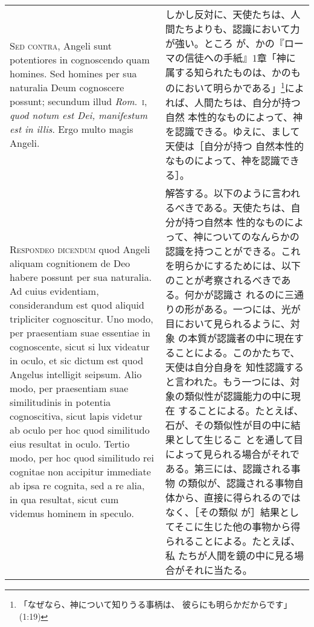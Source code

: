 \documentclass[10pt]{jsarticle} %
\begin{document}
\begin{longtable}{p{21em}p{21em}}
\\


{\scshape Sed contra}, Angeli sunt potentiores in cognoscendo quam
homines. Sed homines per sua naturalia Deum cognoscere possunt;
secundum illud {\itshape Rom}.~{\scshape i}, {\itshape quod notum est
Dei, manifestum est in illis}. Ergo multo magis Angeli.


&


しかし反対に、天使たちは、人間たちよりも、認識において力が強い。ところ
が、かの『ローマの信徒への手紙』1章「神に属する知られたものは、かのも
のにおいて明らかである」\footnote{「なぜなら、神について知りうる事柄は、
彼らにも明らかだからです」(1:19)}によれば、人間たちは、自分が持つ自然
本性的なものによって、神を認識できる。ゆえに、まして天使は［自分が持つ
自然本性的なものによって、神を認識できる］。

\\


{\scshape Respondeo dicendum} quod Angeli aliquam cognitionem de Deo
habere possunt per sua naturalia. Ad cuius evidentiam, considerandum
est quod aliquid tripliciter cognoscitur. Uno modo, per praesentiam
suae essentiae in cognoscente, sicut si lux videatur in oculo, et sic
dictum est quod Angelus intelligit seipsum. Alio modo, per praesentiam
suae similitudinis in potentia cognoscitiva, sicut lapis videtur ab
oculo per hoc quod similitudo eius resultat in oculo. Tertio modo, per
hoc quod similitudo rei cognitae non accipitur immediate ab ipsa re
cognita, sed a re alia, in qua resultat, sicut cum videmus hominem in
speculo.


&


解答する。以下のように言われるべきである。天使たちは、自分が持つ自然本
性的なものによって、神についてのなんらかの認識を持つことができる。これ
を明らかにするためには、以下のことが考察されるべきである。何かが認識さ
れるのに三通りの形がある。一つには、光が目において見られるように、対象
の本質が認識者の中に現在することによる。このかたちで、天使は自分自身を
知性認識すると言われた。もう一つには、対象の類似性が認識能力の中に現在
することによる。たとえば、石が、その類似性が目の中に結果として生じるこ
とを通して目によって見られる場合がそれである。第三には、認識される事物
の類似が、認識される事物自体から、直接に得られるのではなく、［その類似
が］結果としてそこに生じた他の事物から得られることによる。たとえば、私
たちが人間を鏡の中に見る場合がそれに当たる。


\\




\end{longtable}
\end{document}
